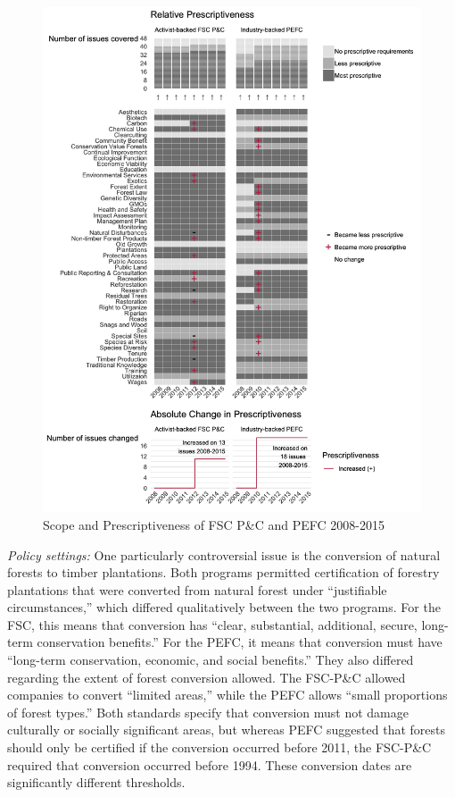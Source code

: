 \documentclass[
      12pt,
            Review ]{article}
\begin{document}
\begin{figure}
\centering
\includegraphics{FSC-PEFC-1.png}
\caption{Scope and Prescriptiveness of FSC P\&C and PEFC 2008-2015}
\end{figure}

\emph{Policy settings:} One particularly controversial issue is the conversion of natural forests to timber plantations. Both programs permitted certification of forestry plantations that were converted from natural forest under ``justifiable circumstances,'' which differed qualitatively between the two programs. For the FSC, this means that conversion has ``clear, substantial, additional, secure, long-term conservation benefits.'' For the PEFC, it means that conversion must have ``long-term conservation, economic, and social benefits.'' They also differed regarding the extent of forest conversion allowed. The FSC-P\&C allowed companies to convert ``limited areas,'' while the PEFC allows ``small proportions of forest types.'' Both standards specify that conversion must not damage culturally or socially significant areas, but whereas PEFC suggested that forests should only be certified if the conversion occurred before 2011, the FSC-P\&C required that conversion occurred before 1994. These conversion dates are significantly different thresholds.
\end{document}
